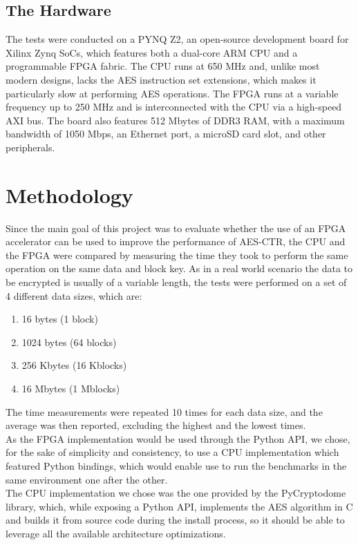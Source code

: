 \documentclass[12pt,oneside,a4paper]{article}
\begin{document}
\subsection{The Hardware} \label{subsec:the-hardware}
The tests were conducted on a PYNQ Z2, an open-source development board for Xilinx Zynq SoCs, which features both a dual-core ARM CPU and a programmable FPGA fabric.
The CPU runs at 650 MHz and, unlike most modern designs, lacks the AES instruction set extensions, which makes it particularly slow at performing AES operations.
The FPGA runs at a variable frequency up to 250 MHz and is interconnected with the CPU via a high-speed AXI bus.
The board also features 512 Mbytes of DDR3 RAM, with a maximum bandwidth of 1050 Mbps, an Ethernet port, a microSD card slot, and other peripherals.

\section{Methodology} \label{sec:methodology}
Since the main goal of this project was to evaluate whether the use of an FPGA accelerator can be used to improve the performance of AES-CTR, the CPU and the FPGA were compared by measuring the time they took to perform the same operation on the same data and block key.
As in a real world scenario the data to be encrypted is usually of a variable length, the tests were performed on a set of 4 different data sizes, which are:
\begin{enumerate}
	\item 16 bytes (1 block)
	\item 1024 bytes (64 blocks)
	\item 256 Kbytes (16 Kblocks)
	\item 16 Mbytes (1 Mblocks)
\end{enumerate}
The time measurements were repeated 10 times for each data size, and the average was then reported, excluding the highest and the lowest times.
\\As the FPGA implementation would be used through the Python API, we chose, for the sake of simplicity and consistency, to use a CPU implementation which featured Python bindings, which would enable use to run the benchmarks in the same environment one after the other.
\\The CPU implementation we chose was the one provided by the PyCryptodome library, which, while exposing a Python API, implements the AES algorithm in C and builds it from source code during the install process, so it should be able to leverage all the available architecture optimizations.
\end{document}
